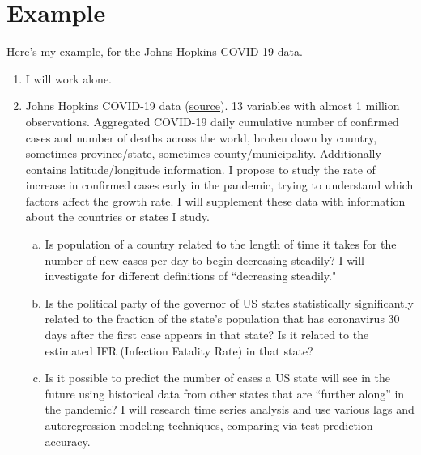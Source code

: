 \documentclass[12pt]{article}
\begin{document}
\section*{Example}

Here's my example, for the Johns Hopkins COVID-19 data.

\begin{enumerate}
	\item I will work alone.
	\item Johns Hopkins COVID-19 data (\href{https://data.world/covid-19-data-resource-hub/covid-19-case-counts/workspace/project-summary?agentid=covid-19-data-resource-hub&datasetid=covid-19-case-counts}{source}). 13 variables with almost 1 million observations. Aggregated COVID-19 daily cumulative number of confirmed cases and number of deaths across the world, broken down by country, sometimes province/state, sometimes county/municipality. Additionally contains latitude/longitude information. I propose to study the rate of increase in confirmed cases early in the pandemic, trying to understand which factors affect the growth rate. I will supplement these data with information about the countries or states I study.
	\begin{enumerate}[(a)]
		\item Is population of a country related to the length of time it takes for the number of new cases per day to begin decreasing steadily? I will investigate for different definitions of ``decreasing steadily."
		\item Is the political party of the governor of US states statistically significantly related to the fraction of the state's population that has coronavirus 30 days after the first case appears in that state? Is it related to the estimated IFR (Infection Fatality Rate) in that state?
		\item Is it possible to predict the number of cases a US state will see in the future using historical data from other states that are ``further along'' in the pandemic? I will research time series analysis and use various lags and autoregression modeling techniques, comparing via test prediction accuracy.
	\end{enumerate}
\end{enumerate}
\end{document}
